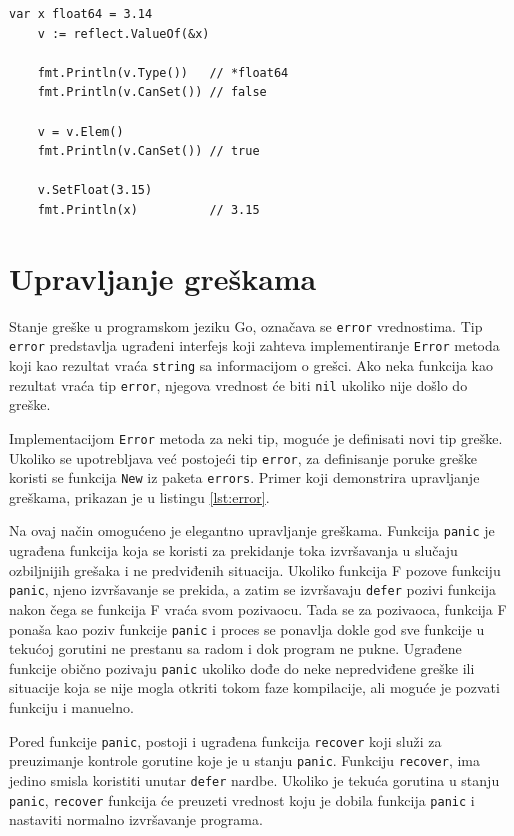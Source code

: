 \documentclass[12pt,oneside]{memoir}
\begin{document}
 \begin{center}
\begin{lstlisting}[caption=Primer koji demonstrira osnovnu upotrebu refleksije, label={lst:ref},  backgroundcolor=\color{background}]
	var x float64 = 3.14
	v := reflect.ValueOf(&x) 
	
	fmt.Println(v.Type())	// *float64
	fmt.Println(v.CanSet())	// false
	
	v = v.Elem()
	fmt.Println(v.CanSet())	// true
	
	v.SetFloat(3.15)
	fmt.Println(x)			// 3.15
\end{lstlisting}
\end{center}

\section{Upravljanje greškama} \label{error}

Stanje greške u programskom jeziku Go, označava se \texttt{error} vrednostima. Tip \texttt{error} predstavlja ugrađeni interfejs koji zahteva implementiranje \texttt{Error} metoda koji kao rezultat vraća \texttt{string} sa informacijom o grešci. Ako neka funkcija kao rezultat vraća tip \texttt{error}, njegova vrednost će biti \texttt{nil} ukoliko nije došlo do greške. 

Implementacijom \texttt{Error} metoda za neki tip, moguće je definisati novi tip greške. Ukoliko se upotrebljava već postojeći tip \texttt{error}, za definisanje poruke greške koristi se funkcija \texttt{New} iz paketa \texttt{errors}. Primer koji demonstrira upravljanje greškama, prikazan je u listingu \ref{lst:error}.

Na ovaj način omogućeno je elegantno upravljanje greškama. Funkcija \texttt{panic} je ugrađena funkcija koja se koristi za prekidanje toka izvršavanja u slučaju ozbiljnijih grešaka i ne predviđenih situacija. Ukoliko funkcija F pozove funkciju \texttt{panic}, njeno izvršavanje se prekida, a zatim se izvršavaju \texttt{defer} pozivi funkcija nakon čega se funkcija F vraća svom pozivaocu. Tada se za pozivaoca, funkcija F ponaša kao poziv funkcije \texttt{panic} i proces se ponavlja dokle god sve funkcije u tekućoj gorutini ne prestanu sa radom i dok program ne pukne. Ugrađene funkcije obično pozivaju \texttt{panic} ukoliko dođe do neke nepredviđene greške ili situacije koja se nije mogla otkriti tokom faze kompilacije, ali moguće je pozvati funkciju i manuelno. 

Pored funkcije \texttt{panic}, postoji i ugrađena funkcija \texttt{recover} koji služi za preuzimanje kontrole gorutine koje je u stanju \texttt{panic}. Funkciju \texttt{recover}, ima jedino smisla koristiti unutar \texttt{defer} nardbe. Ukoliko je tekuća gorutina u stanju \texttt{panic}, \texttt{recover} funkcija će preuzeti vrednost koju je dobila funkcija \texttt{panic} i nastaviti normalno izvršavanje programa.
\end{document}
